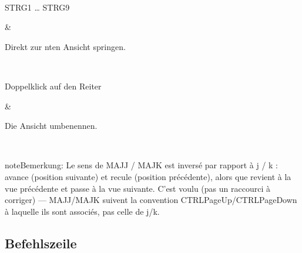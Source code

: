 \documentclass[letterpaper,10pt,german]{sphinxmanual}
\begin{document}
\begin{savenotes}
\begin{tabular}[t]{}
\begin{varwidth}[t]{}
\end{varwidth}%
\\
\sphinxhline\begin{varwidth}[t]{}
\sphinxAtStartPar
STRG\sphinxhyphen{}1 … STRG\sphinxhyphen{}9
\sphinxbeforeendvarwidth
\end{varwidth}%
&\begin{varwidth}[t]{}
\sphinxAtStartPar
Direkt zur n\sphinxhyphen{}ten Ansicht springen.
\sphinxbeforeendvarwidth
\end{varwidth}%
\\
\sphinxhline\begin{varwidth}[t]{}
\sphinxAtStartPar
Doppelklick auf den Reiter
\sphinxbeforeendvarwidth
\end{varwidth}%
&\begin{varwidth}[t]{}
\sphinxAtStartPar
Die Ansicht umbenennen.
\sphinxbeforeendvarwidth
\end{varwidth}%
\\
\sphinxbottomrule
\end{tabular}
\sphinxtableafterendhook\par
\sphinxattableend\end{savenotes}

\begin{sphinxadmonition}{note}{Bemerkung:}
\sphinxAtStartPar
Le sens de MAJ\sphinxhyphen{}J / MAJ\sphinxhyphen{}K est inversé par rapport à j / k :  avance
(position suivante) et  recule (position précédente), alors que
 revient à la vue précédente et  passe à la vue suivante.
C’est voulu (pas un raccourci à corriger) — MAJ\sphinxhyphen{}J/MAJ\sphinxhyphen{}K suivent la
convention CTRL\sphinxhyphen{}PageUp/CTRL\sphinxhyphen{}PageDown à laquelle ils sont associés, pas
celle de j/k.
\end{sphinxadmonition}


\subsection{Befehlszeile}
\label{\detokenize{raccourcis:ligne-de-commande}}\label{\detokenize{raccourcis:raccourcis-command}}
\end{document}
